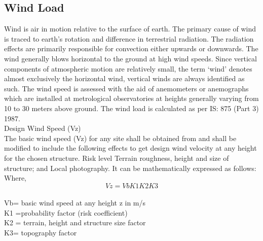 \subsection{Wind Load}
Wind is air in motion relative to the surface of earth. The primary cause of wind is traced to earth’s rotation and difference in terrestrial radiation. The radiation effects are primarily responsible for convection either upwards or downwards. The wind generally blows horizontal to the ground at high wind speeds. Since vertical components of atmospheric motion are relatively small, the term ‘wind’ denotes almost exclusively the horizontal wind, vertical winds are always identified as such. The wind speed is assessed with the aid of anemometers or anemographs which are installed at metrological observatories at heights generally varying from 10 to 30 meters above ground. The wind load is calculated as per IS: 875 (Part 3) 1987.\\
Design Wind Speed (Vz)\\
The basic wind speed (Vz) for any site shall be obtained from and shall be modified to include the following effects to get design wind velocity at any height for the chosen structure.
Risk level
Terrain roughness, height and size of structure; and
Local photography.
It can be mathematically expressed as follows:\\
Where,
\begin{equation}
Vz = Vb  K1  K2  K3
\end{equation}\\
Vb= basic wind speed at any height z in m/s\\
K1 =probability factor (risk coefficient)\\
K2 = terrain, height and structure size factor \\
K3= topography factor\\

